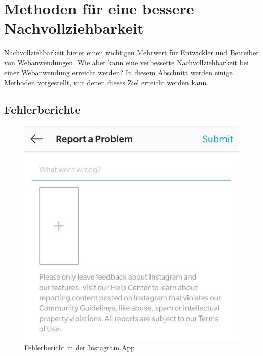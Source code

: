 

\section{Methoden für eine bessere Nachvollziehbarkeit}
\label{sec:methoden}

Nachvollziehbarkeit bietet einen wichtigen Mehrwert für Entwickler und Betreiber von Webanwendungen. Wie aber kann eine verbesserte Nachvollziehbarkeit bei einer Webanwendung erreicht werden? In diesem Abschnitt werden einige Methoden vorgestellt, mit denen dieses Ziel erreicht werden kann.

\subsection{Fehlerberichte}

\begin{figure}
\centering
\includegraphics[width=\linewidth]{img/instagram-feedback/instagram-feedback.jpg}
\caption{Fehlerbericht in der Instagram App \cite{Instagram}}
\label{fig:instagram-bug-report}
\end{figure}

